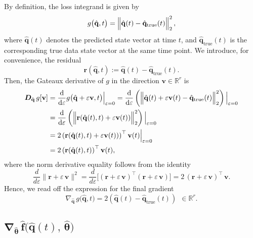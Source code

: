 By definition, the loss integrand is given by\\
$$g\bigl(\hat{\mathbf{q}},t\bigr)= \Bigl\|\hat{\mathbf{q}}(t) - \hat{\mathbf{q}}_{\mathrm{true}}(t)\Bigr\|_2^2\,,$$
where $\hat{\mathbf{q}}(t)$ denotes the predicted state vector at time $t$, and $\hat{\mathbf{q}}_{\text{true}}(t)$ is the corresponding true data state vector at the same time point.
We introduce, for convenience, the residual\\
$$\mathbf{r}(\hat{\mathbf{q}},t):=  \hat{\mathbf{q}}(t) - \hat{\mathbf{q}}_{\mathrm{true}}(t).$$
Then, the Gateaux derivative of $g$ in the direction $\mathbf{v}\in\mathbb{R}^r$ is\\
\begin{align*}
\label{eq:gradient_3}
\bm{D}_{\hat{\mathbf{q}}}\,g[\mathbf{v}]
&=\frac{\mathrm{d}}{\mathrm{d}\varepsilon}
g\bigl(\hat{\mathbf{q}}+\varepsilon\mathbf{v},t\bigr)\Big|_{\varepsilon=0}=
\frac{\mathrm{d}}{\mathrm{d}\varepsilon}\left( \Bigl\|\hat{\mathbf{q}}(t) + \varepsilon\mathbf{v}(t) - \hat{\mathbf{q}}_{\mathrm{true}}(t)\Bigr\|_2^2\right) \Big|_{\varepsilon=0}\\
 &= \frac{\mathrm{d}}{\mathrm{d}\varepsilon}\left( \Bigl\|\mathbf{r}(\hat{\mathbf{q}}(t),t) + \varepsilon\mathbf{v}(t))\Bigr\|_2^2\right) \Big|_{\varepsilon=0}\\
 &= 2\left(\mathbf{r}(\hat{\mathbf{q}}(t),t) + \varepsilon\mathbf{v}(t))\right)^{\top}\mathbf{v}(t) \Big|_{\varepsilon=0}\\
 &= 2\left(\mathbf{r}(\hat{\mathbf{q}}(t),t)\right)^{\top}\mathbf{v}(t),
\end{align*}
where the norm derivative equality follows from the identity\\
$$\frac{d}{d\varepsilon}\|\mathbf{r} + \varepsilon\,\mathbf{v}\|^2
= \frac{d}{d\varepsilon}\bigl[(\mathbf{r} + \varepsilon\,\mathbf{v})^\top (\mathbf{r} + \varepsilon\,\mathbf{v})\bigr]= 2\,(\mathbf{r} + \varepsilon\,\mathbf{v})^\top\,\mathbf{v}.$$
Hence, we read off the expression for the final gradient\\
\begin{equation}
\label{eq:gradient_3}
\nabla_{\hat{\mathbf{q}}}\,g\bigl(\hat{\mathbf{q}},t\bigr) = 2\left(\hat{\mathbf{q}}(t) - \hat{\mathbf{q}}_{\mathrm{true}}(t)\right)~~\in\mathbb{R}^r.
\end{equation}

\subsection{$\bm{\nabla}_{\hat{\bm{\theta}}}\,\hat{\mathbf{f}}\bigl(\hat{\mathbf{q}}(t),\,\hat{\bm{\theta}}\bigr)$}

